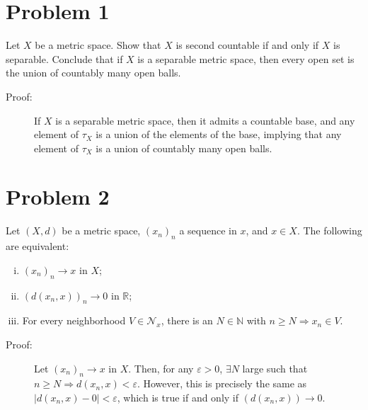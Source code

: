 \documentclass[8pt]{extarticle}
\title{}
\author{}
\date{}
\newcommand{\N}{\mathbb{N}}
\newcommand{\R}{\mathbb{R}}
\begin{document}
  \section{Problem 1}%
  Let $X$ be a metric space. Show that $X$ is second countable if and only if $X$ is separable. Conclude that if $X$ is a separable metric space, then every open set is the union of countably many open balls.
  \begin{description}
    \item[Proof:]\hfill
      If $X$ is a separable metric space, then it admits a countable base, and any element of $\tau_X$ is a union of the elements of the base, implying that any element of $\tau_X$ is a union of countably many open balls.
  \end{description}
  \section{Problem 2}%
  Let $(X,d)$ be a metric space, $(x_n)_n$ a sequence in $x$, and $x\in X$. The following are equivalent:
  \begin{enumerate}[(i)]
    \item $(x_n)_n \rightarrow x$ in $X$;
    \item $(d(x_n,x))_n\rightarrow 0$ in $\R$;
    \item For every neighborhood $V\in \mathcal{N}_x$, there is an $N\in \N$ with $n\geq N \Rightarrow x_n\in V$.
  \end{enumerate}
  \begin{description}
    \item[Proof:] Let $(x_n)_n\rightarrow x$ in $X$. Then, for any $\varepsilon > 0$, $\exists N$ large such that $n\geq N \Rightarrow d(x_n,x) < \varepsilon$. However, this is precisely the same as $|d(x_n,x) - 0| < \varepsilon$, which is true if and only if $(d(x_n,x))\rightarrow 0$.
  \end{description}
\end{document}
